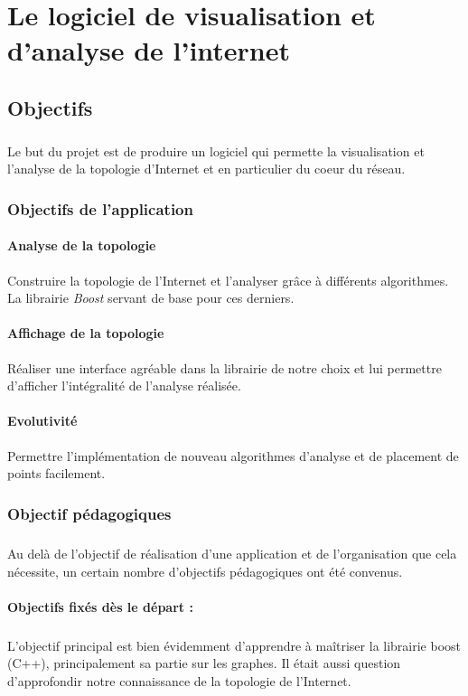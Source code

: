 \section{Le logiciel de visualisation et d'analyse de l'internet}
\subsection{Objectifs}
\subparagraph{}
Le but du projet est de produire un logiciel qui permette la visualisation et l'analyse de la topologie d'Internet et en particulier du coeur du réseau.

\subsubsection{Objectifs de l'application}
\label{obj}
\paragraph{Analyse de la topologie}
Construire la topologie de l'Internet et l'analyser grâce à différents algorithmes. La librairie \textit{Boost} servant de base pour ces derniers.

\paragraph{Affichage de la topologie}
Réaliser une interface agréable dans la librairie de notre choix et lui permettre d'afficher l'intégralité de l'analyse réalisée.

\paragraph{Evolutivité}
Permettre l'implémentation de nouveau algorithmes d'analyse et de placement de points facilement.

\subsubsection{Objectif pédagogiques}
\subparagraph{}
Au delà de l'objectif de réalisation d'une application et de l'organisation que cela nécessite, un certain nombre d'objectifs pédagogiques ont été convenus.

\paragraph{Objectifs fixés dès le départ : } 
\subparagraph{}
L'objectif principal est bien évidemment d'apprendre à maîtriser la librairie boost (C++), principalement sa partie sur les graphes. Il était aussi question d'approfondir notre connaissance de la topologie de l'Internet.

